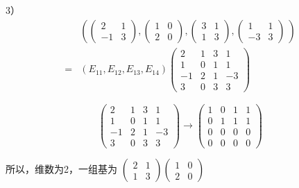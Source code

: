 \documentclass[13pt]{beamer}
\begin{document}
\begin{frame}
3）
\begin{align*}
& \left(
\left(\begin{array}{cc}2 & 1 \\ -1 & 3\end{array}\right), 
\left(\begin{array}{cc}1 & 0 \\ 2 & 0\end{array}\right), 
\left(\begin{array}{cc}3& 1 \\ 1 &3\end{array}\right), 
\left(\begin{array}{cc}1 & 1 \\ -3 & 3\end{array}\right)\
\right)\\
= & \left(E_{11}, E_{12}, E_{13}, E_{14}\right)
\left(\begin{array}{cccc} 2 & 1 & 3 & 1 \\ 1 & 0 & 1 & 1 \\ -1 & 2 & 1 & -3 \\ 3 & 0 & 3 & 3\end{array}\right) 
\end{align*}


$$\left(\begin{array}{cccc}2 & 1 & 3 & 1 \\ 1 & 0 & 1 & 1 \\ -1 & 2 & 1 & -3 \\ 3 & 0 & 3 & 3\end{array}\right) 
\rightarrow
\left(\begin{array}{cccc}1 & 0 & 1 & 1 \\ 0 & 1 & 1 & 1 \\ 0 & 0 & 0 & 0 \\ 0 & 0 & 0 & 0\end{array}\right)$$

所以，维数为2，一组基为 
$\left(\begin{array}{ll}2 & 1 \\ 1 & 3\end{array}\right)\left(\begin{array}{ll}1 & 0 \\ 2 & 0\end{array}\right)$

\end{frame}
\end{document}
